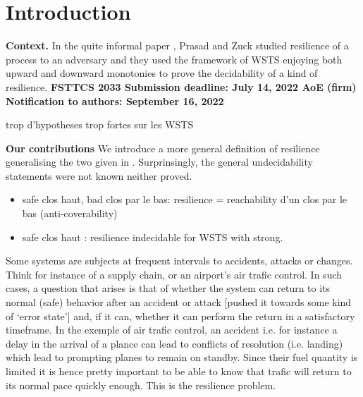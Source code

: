 \section{Introduction}\label{section introduction}


{\bf Context.} In the quite informal paper \cite{DBLP:journals/corr/PrasadZ16}, Prasad and Zuck studied resilience of a process to an adversary and they used the framework of WSTS enjoying both upward and downward monotonies to prove the decidability of a kind of resilience.
%
%
{\bf FSTTCS 2033  Submission deadline: July 14, 2022 AoE (firm)
Notification to authors: September 16, 2022}

trop d'hypotheses trop fortes sur les WSTS

{\bf Our contributions}
We introduce a more general definition of resilience generalising the two given in \cite{DBLP:conf/gg/Ozkan22}.
Surprinsingly, the general undecidability statements were not known neither proved.

\begin{itemize}

\item safe clos haut, bad clos par le bas: resilience = reachability d'un clos par le bas (anti-coverability)

\item safe clos haut : resilience indecidable for WSTS with strong.

\end{itemize}



Some systems are subjects at frequent intervals to accidents, attacks or changes. Think for instance of a supply chain, or an airport’s air trafic control. In such cases, a question that arises is that of whether the system can return to its normal (safe) behavior after an accident or attack [pushed it towards some kind of ‘error state’] and, if it can, whether it can perform the return in a satisfactory timeframe. In the exemple of air trafic control, an accident i.e. for instance a delay in the arrival of a plance can lead to conflicts of resolution (i.e. landing) which lead to prompting planes to remain on standby. Since their fuel quantity is limited it is hence pretty important to be able to know that trafic will return to its normal pace quickly enough. This is the resilience problem. 

